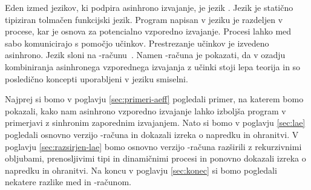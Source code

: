 %



Eden izmed jezikov, ki podpira asinhrono izvajanje, je jezik \aeff{}. Jezik \aeff{} je statično tipiziran tolmačen funkcijski jezik. Program napisan v jeziku \aeff{} je razdeljen v procese, kar je osnova za potencialno vzporedno izvajanje. Procesi lahko med sabo komunicirajo s pomočjo učinkov. Prestrezanje učinkov je izvedeno asinhrono.
Jezik \aeff{} sloni na \lae{}-računu~\cite{aeff}. Namen \lae{}-računa je pokazati, da v ozadju kombiniranja asinhronega vzporednega izvajanja z učinki stoji lepa teorija in so posledično koncepti uporabljeni v jeziku \aeff{} smiselni.


Najprej si bomo v poglavju \ref{sec:primeri-aeff} pogledali primer, na katerem bomo pokazali, kako nam asinhrono vzporedno izvajanje lahko izboljša program v primerjavi z sinhronim zaporednim izvajanjem.
Nato si bomo v poglavju \ref{sec:lae} pogledali osnovno verzijo \lae{}-računa in dokazali izreka o napredku in ohranitvi. V poglavju \ref{sec:razsirjen-lae} bomo osnovno verzijo \lae{}-računa razširili z rekurzivnimi obljubami, prenosljivimi tipi in dinamičnimi procesi in ponovno dokazali izreka o napredku in ohranitvi. Na koncu v poglavju \ref{sec:konec} si bomo pogledali nekatere razlike med \aeff{} in \lae{}-računom.